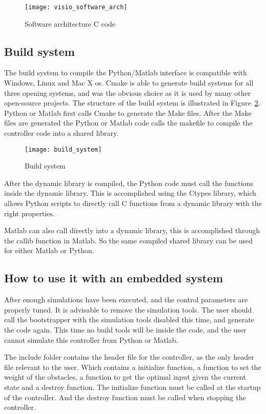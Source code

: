	\begin{figure}[H]
		\centering
		\texttt{[image: visio\_software\_arch]}
		\caption{Software architecture C code}
		\label{fig:visio software arch}
	\end{figure}

\subsection{Build system}
The build system to compile the Python/Matlab interface is compatible with Windows, Linux and Mac X os. Cmake is able to generate build systems for all three opening systems, and was the obvious choice as it is used by many other open-source projects. The structure of the build system is illustrated in Figure~\ref{fig:build system}. Python or Matlab first calls Cmake to generate the Make files. After the Make files are generated the Python or Matlab code calls the makefile to compile the controller code into a shared library.

\begin{figure}[H]
	\centering
	\texttt{[image: build\_system]}
	\caption{Build system}
	\label{fig:build system}
\end{figure}

After the dynamic library is compiled, the Python code must call the functions inside the dynamic library. This is accomplished using the Ctypes library, which allows Python scripts to directly call C functions from a dynamic library with the right properties.

Matlab can also call directly into a dynamic library, this is accomplished through the callib function in Matlab. So the same compiled shared library can be used for either Matlab or Python.

\subsection{How to use it with an embedded system}
After enough simulations have been executed, and the control parameters are properly tuned. It is advisable to remove the simulation tools. The user should call the bootstrapper with the simulation tools disabled this time, and generate the code again. This time no build tools will be inside the code, and the user cannot simulate this controller from Python or Matlab.

The include folder contains the header file for the controller, as the only header file relevant to the user. Which contains a initialize function, a function to set the weight of the obstacles, a function to get the optimal input given the current state and a destroy function. The initialize function must be called at the startup of the controller. And the destroy function must be called when stopping the controller.

